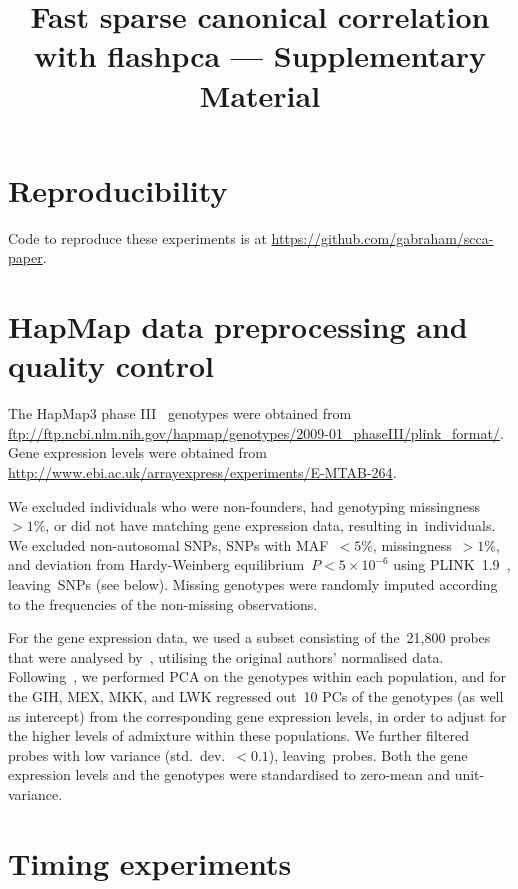 \documentclass[a4paper,12pt]{article}
\title{Fast sparse canonical correlation with flashpca --- Supplementary
Material}
\begin{document}
\maketitle

\section{Reproducibility}

Code to reproduce these experiments is at
\url{https://github.com/gabraham/scca-paper}.

\section{HapMap data preprocessing and quality control}

The HapMap3 phase III~\citep{hapmap2010} genotypes were obtained from
\url{ftp://ftp.ncbi.nlm.nih.gov/hapmap/genotypes/2009-01_phaseIII/plink_format/}.
Gene expression levels were obtained from
\url{http://www.ebi.ac.uk/arrayexpress/experiments/E-MTAB-264}.

We excluded individuals who were non-founders, had genotyping
missingness~${>}1\%$, or did not have matching gene expression data,
resulting in~\nindiv individuals. We excluded non-autosomal SNPs, SNPs
with MAF~${<}5\%$, missingness~${>}1\%$, and deviation from Hardy-Weinberg
equilibrium~$P{<}5\times10^{-6}$ using PLINK~1.9~\citep{purcell2007,Chang2015},
leaving~\nsnps SNPs (see below). Missing genotypes were randomly imputed
according to the frequencies of the non-missing observations.

For the gene expression data, we used a subset consisting of the~21,800 probes
that were analysed by~\citep{Stranger2012}, utilising the original authors'
normalised data. Following~\citep{Stranger2012}, we performed PCA on the
genotypes within each population, and for the GIH, MEX, MKK, and LWK regressed
out~10 PCs of the genotypes (as well as intercept) from the corresponding gene
expression levels, in order to adjust for the higher levels of admixture within
these populations.  We further filtered probes with low variance
(std.~dev.~${<}0.1$), leaving~\ngenes probes. Both the gene expression levels and
the genotypes were standardised to zero-mean and unit-variance.

\section{Timing experiments}
\end{document}
